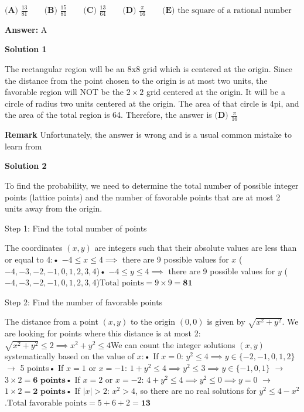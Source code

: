 \begin{enumerate}
 $\textbf{(A) }\frac{13}{81}\qquad \textbf{(B) }\frac{15}{81}\qquad \textbf{(C) }\frac{13}{64}\qquad \textbf{(D) }\frac{\pi}{16}\qquad \textbf{(E) }\text{the square of a rational number}$

 \textbf{Answer: }A



\textbf{Solution 1}

The rectangular region will be an 8x8 grid which is centered at the origin. Since the distance from the point chosen to the origin is at most two units, the favorable region will NOT be the $2 \times 2$ grid centered at the origin. It will be a circle of radius two units centered at the origin. The area of that circle is 4pi, and the area of the total region is 64. Therefore, the answer is $\boxed{\textbf{(D) }\frac{\pi}{16}}$

 \textbf{Remark} Unfortunately, the answer is wrong and is a usual common mistake to learn from

 



\textbf{Solution 2}

To find the probability, we need to determine the total number of possible integer points (lattice points) and the number of favorable points that are at most 2 units away from the origin.

 Step 1: Find the total number of points

 The coordinates \((x, y)\) are integers such that their absolute values are less than or equal to 4:• \(-4 \le x \le 4 \implies\) there are 9 possible values for \(x\) (\(-4, -3, -2, -1, 0, 1, 2, 3, 4\))• \(-4 \le y \le 4 \implies\) there are 9 possible values for \(y\) (\(-4, -3, -2, -1, 0, 1, 2, 3, 4\))\(\text{Total\ points}=9\times 9=\mathbf{81}\)

 Step 2: Find the number of favorable points

 The distance from a point \((x, y)\) to the origin \((0, 0)\) is given by \(\sqrt{x^{2}+y^{2}}\). We are looking for points where this distance is at most 2:\(\sqrt{x^{2}+y^{2}}\le 2\implies x^{2}+y^{2}\le 4\)We can count the integer solutions \((x, y)\) systematically based on the value of \(x\):• If \(x = 0\): \(y^2 \le 4 \implies y \in \{-2, -1, 0, 1, 2\}\) \(\rightarrow \) 5 points• If \(x = 1\) or \(x = -1\): \(1 + y^2 \le 4 \implies y^2 \le 3 \implies y \in \{-1, 0, 1\}\) \(\rightarrow \) \(3 \times 2 = \mathbf{6\text{ points}}\)• If \(x = 2\) or \(x = -2\): \(4 + y^2 \le 4 \implies y^2 \le 0 \implies y = 0\) \(\rightarrow \) \(1 \times 2 = \mathbf{2\text{ points}}\)• If \(\vert{}x\vert{} > 2\): \(x^2 > 4\), so there are no real solutions for \(y^2 \le 4 - x^2\).\(\text{Total\ favorable\ points}=5+6+2=\mathbf{13}\)


\end{enumerate}
